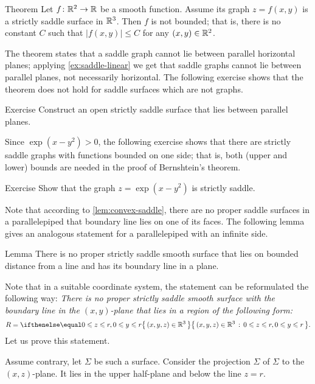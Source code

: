 \begin{thm}{Theorem}\label{thm:bernshtein}
Let $f\colon\mathbb{R}^2\to\mathbb{R}$ be a smooth function.
Assume its graph $z=f(x,y)$ is a strictly saddle surface in $\mathbb{R}^3$.
Then $f$ is not bounded;
that is, there is no constant $C$ such that 
$|f(x,y)|\le C$ for any $(x,y)\in\mathbb{R}^2$.
\end{thm}

The theorem states that a saddle graph cannot lie between parallel horizontal planes;
applying \ref{ex:saddle-linear} we get that saddle graphs cannot lie between parallel planes,
not necessarily horizontal.
The following exercise shows that the theorem does not hold for saddle surfaces which are not graphs.


\begin{thm}{Exercise}\label{ex:between-parallels}
Construct an open strictly saddle surface that lies between parallel planes.
\end{thm}

Since $\exp(x-y^2)>0$,
the following exercise shows that there are strictly saddle graphs with functions bounded on one side; that is, both (upper and lower) bounds are needed in the proof of Bernshtein's theorem.

\begin{thm}{Exercise}\label{ex:one-side-bernshtein}
Show that the graph
$z=\exp(x-y^2)$
is strictly saddle.
\end{thm}

Note that according to \ref{lem:convex-saddle}, there are no proper saddle surfaces in a parallelepiped that boundary line lies on one of its faces.
The following lemma gives an analogous statement for a parallelepiped with an infinite side.

\begin{thm}{Lemma}\label{lem:region}
There is no proper strictly saddle smooth surface that lies on bounded distance from a line
and has its boundary line in a plane.
\end{thm}


Note that in a suitable coordinate system, the statement can be reformulated the following way:
\emph{There is no proper strictly saddle smooth surface 
with the boundary line in the $(x,y)$-plane
that lies in a region of the following form:}
\[R=\set{(x,y,z)\in\RR^3}{0\le z\le r, 0\le y\le r}.\]
Let us prove this statement.

Assume contrary, let $\Sigma$ be such a surface.
Consider the projection $\hat \Sigma$ of $\Sigma$ to the $(x,z)$-plane.
It lies in the upper half-plane and below the line $z=r$.


